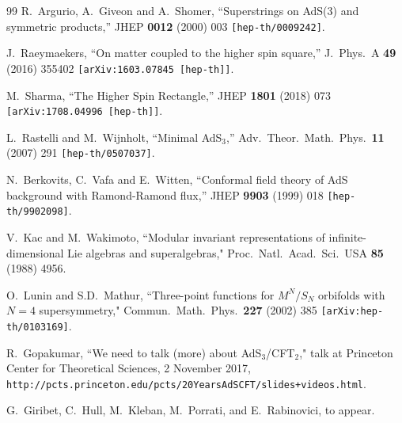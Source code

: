 \documentclass[12pt,a4paper]{article}
\begin{document}
\begin{thebibliography}{99}
R.~Argurio, A.~Giveon and A.~Shomer,
``Superstrings on AdS(3) and symmetric products,''
JHEP {\bf 0012} (2000) 003
{\tt [hep-th/0009242]}.    

J.~Raeymaekers,
``On matter coupled to the higher spin square,''
J.\ Phys.\ A {\bf 49} (2016) 355402 
{\tt [arXiv:1603.07845 [hep-th]]}.
  
M.~Sharma,
``The Higher Spin Rectangle,''
JHEP {\bf 1801} (2018) 073 
{\tt [arXiv:1708.04996 [hep-th]]}.  

L.~Rastelli and M.~Wijnholt,
``Minimal AdS$_3$,''
Adv.\ Theor.\ Math.\ Phys.\  {\bf 11} (2007) 291 
{\tt [hep-th/0507037]}.

N.~Berkovits, C.~Vafa and E.~Witten,
``Conformal field theory of AdS background with Ramond-Ramond flux,''
JHEP {\bf 9903} (1999) 018
{\tt [hep-th/9902098]}.

V.~Kac and M.~Wakimoto, 
``Modular invariant representations of infinite-dimensional Lie algebras and superalgebras,"
Proc.\ Natl.\ Acad.\ Sci.\ USA {\bf 85} (1988) 4956.

O.~Lunin and S.D.~Mathur,
``Three-point functions for $M^N/S_{N}$ orbifolds with $N = 4$ supersymmetry,"
Commun.\ Math.\ Phys.\  {\bf 227} (2002) 385 
{\tt [arXiv:hep-th/0103169]}.

R.~Gopakumar, ``We need to talk (more) about AdS$_3$/CFT$_2$,"
talk at Princeton Center for Theoretical Sciences, 2 November 2017,
{\tt http://pcts.princeton.edu/pcts/20YearsAdSCFT/slides+videos.html}.

G.~Giribet, C.~Hull, M.~Kleban, M.~Porrati, and E.~Rabinovici, to appear.

\end{thebibliography}
\end{document}
